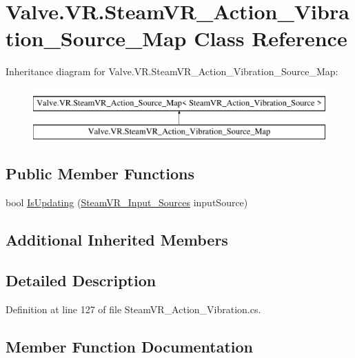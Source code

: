 \hypertarget{class_valve_1_1_v_r_1_1_steam_v_r___action___vibration___source___map}{}\section{Valve.\+V\+R.\+Steam\+V\+R\+\_\+\+Action\+\_\+\+Vibration\+\_\+\+Source\+\_\+\+Map Class Reference}
\label{class_valve_1_1_v_r_1_1_steam_v_r___action___vibration___source___map}
Inheritance diagram for Valve.\+V\+R.\+Steam\+V\+R\+\_\+\+Action\+\_\+\+Vibration\+\_\+\+Source\+\_\+\+Map\+:\begin{figure}[H]
\begin{center}
\leavevmode
\includegraphics[height=2.000000cm]{class_valve_1_1_v_r_1_1_steam_v_r___action___vibration___source___map}
\end{center}
\end{figure}
\subsection*{Public Member Functions}
\begin{DoxyCompactItemize}
\item 
bool \mbox{\hyperlink{class_valve_1_1_v_r_1_1_steam_v_r___action___vibration___source___map_a2081fb618dd6ce10c3f67991c3ffc6f8}{Is\+Updating}} (\mbox{\hyperlink{namespace_valve_1_1_v_r_a82e5bf501cc3aa155444ee3f0662853f}{Steam\+V\+R\+\_\+\+Input\+\_\+\+Sources}} input\+Source)
\end{DoxyCompactItemize}
\subsection*{Additional Inherited Members}


\subsection{Detailed Description}


Definition at line 127 of file Steam\+V\+R\+\_\+\+Action\+\_\+\+Vibration.\+cs.



\subsection{Member Function Documentation}
\mbox{\label{class_valve_1_1_v_r_1_1_steam_v_r___action___vibration___source___map_a2081fb618dd6ce10c3f67991c3ffc6f8}} 
